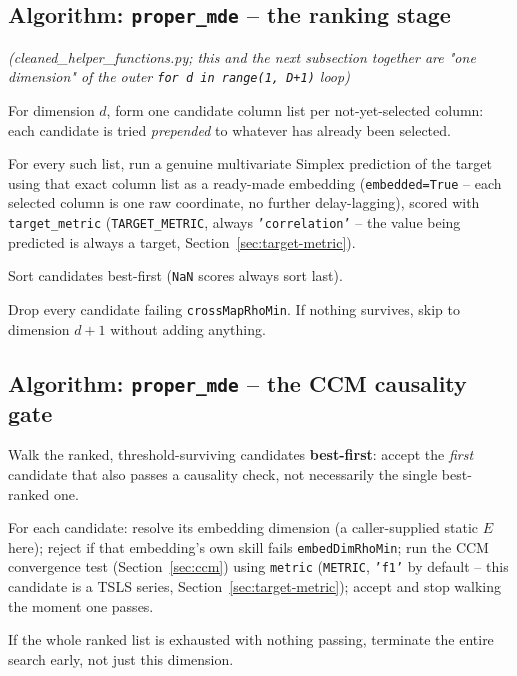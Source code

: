 \documentclass[11pt]{article}
\begin{document}
\subsection{Algorithm: \texttt{proper\_mde} -- the ranking stage}
\label{sec:mde-ranking}
\textit{(cleaned\_helper\_functions.py; this and the next subsection together are "one dimension" of the outer \texttt{for d in range(1, D+1)} loop)}
\begin{steps}
\item For dimension $d$, form one candidate column list per not-yet-selected column: each candidate is tried \emph{prepended} to whatever has already been selected.
\item For every such list, run a genuine multivariate Simplex prediction of the target using that exact column list as a ready-made embedding (\texttt{embedded=True} -- each selected column is one raw coordinate, no further delay-lagging), scored with \texttt{target\_metric} (\texttt{TARGET\_METRIC}, always \texttt{'correlation'} -- the value being predicted is always a target, Section~\ref{sec:target-metric}).
\item Sort candidates best-first (\texttt{NaN} scores always sort last).
\item Drop every candidate failing \texttt{crossMapRhoMin}. If nothing survives, skip to dimension $d{+}1$ without adding anything.
\end{steps}

\subsection{Algorithm: \texttt{proper\_mde} -- the CCM causality gate}
\label{sec:mde-ccm-gate}
\begin{steps}
\item Walk the ranked, threshold-surviving candidates \textbf{best-first}: accept the \emph{first} candidate that also passes a causality check, not necessarily the single best-ranked one.
\item For each candidate: resolve its embedding dimension (a caller-supplied static $E$ here); reject if that embedding's own skill fails \texttt{embedDimRhoMin}; run the CCM convergence test (Section~\ref{sec:ccm}) using \texttt{metric} (\texttt{METRIC}, \texttt{'f1'} by default -- this candidate is a TSLS series, Section~\ref{sec:target-metric}); accept and stop walking the moment one passes.
\item If the whole ranked list is exhausted with nothing passing, terminate the entire search early, not just this dimension.
\end{steps}
\end{document}
